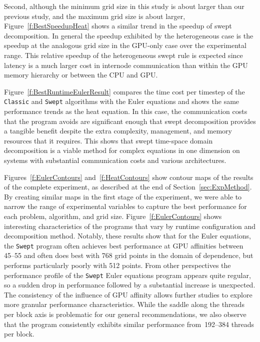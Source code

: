 Second, although the minimum grid size in this study is about  larger
than our previous study, and the maximum grid size is about  larger,
Figure~\ref{f:BestSpeedupHeat} shows a similar trend in the speedup of swept decomposition.
In general the speedup exhibited by the heterogeneous case is  the speedup at the analogous grid size in the GPU-only case over the experimental range.
This relative speedup of the heterogeneous swept rule is expected since latency is a much larger cost in internode communication than within the GPU memory hierarchy or between the CPU and GPU. 

Figure~\ref{f:BestRuntimeEulerResult} compares the time cost per timestep of the \texttt{Classic} and \texttt{Swept} algorithms with the Euler equations and shows the same performance trends as the heat equation.
In this case, the communication costs that the program avoids are significant enough that swept decomposition provides a tangible benefit despite the extra complexity, management, and memory resources that it requires.
This shows that swept time-space domain decomposition is a viable method for complex equations in one dimension on systems with substantial communication costs and various architectures.

Figures~\ref{f:EulerContours} and~\ref{f:HeatContours} show contour maps of the results
of the complete experiment, as described at the end of Section~\ref{sec:ExpMethod}.
By creating similar maps in the first stage of the experiment, we were able to narrow the range of experimental variables to capture the best performance for each problem, algorithm, and grid size.
Figure~\ref{f:EulerContours} shows interesting characteristics of the programs that vary by runtime configuration and decomposition method.
Notably, these results show that for the Euler equations, the \texttt{Swept} program often achieves best performance at GPU affinities between \numrange{45}{55} and often does best with \num{768} grid points in the domain of dependence, but performs particularly poorly with \num{512} points.
From other perspectives the performance profile of the \texttt{Swept} Euler equations program appears quite regular, so a sudden drop in performance followed by a substantial increase is unexpected.
The consistency of the influence of GPU affinity allows further studies to explore more granular performance characteristics.
While the saddle along the threads per block axis is problematic for our
general recommendations, we also observe that the program consistently exhibits similar performance from~\numrange{192}{384} threads per block.

